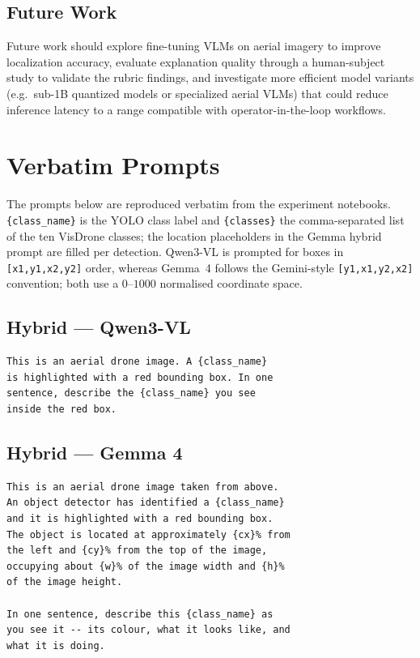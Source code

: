 \documentclass[acmtog, authorversion]{acmart}
\begin{document}
\subsection{Future Work}
Future work should explore fine-tuning VLMs on aerial imagery to
improve localization accuracy, evaluate explanation quality through
a human-subject study to validate the rubric findings, and investigate
more efficient model variants (e.g.\ sub-1B quantized models or
specialized aerial VLMs) that could reduce inference latency to
a range compatible with operator-in-the-loop workflows.




\appendix

\section{Verbatim Prompts}
\label{app:prompts}
The prompts below are reproduced verbatim from the experiment
notebooks. \texttt{\{class\_name\}} is the YOLO class label and
\texttt{\{classes\}} the comma-separated list of the ten VisDrone
classes; the location placeholders in the Gemma hybrid prompt are
filled per detection. Qwen3-VL is prompted for boxes in
\texttt{[x1,y1,x2,y2]} order, whereas Gemma~4 follows the Gemini-style
\texttt{[y1,x1,y2,x2]} convention; both use a $0$--$1000$ normalised
coordinate space.

\subsection{Hybrid --- Qwen3-VL}
\begin{verbatim}
This is an aerial drone image. A {class_name}
is highlighted with a red bounding box. In one
sentence, describe the {class_name} you see
inside the red box.
\end{verbatim}

\subsection{Hybrid --- Gemma 4}
\begin{verbatim}
This is an aerial drone image taken from above.
An object detector has identified a {class_name}
and it is highlighted with a red bounding box.
The object is located at approximately {cx}% from
the left and {cy}% from the top of the image,
occupying about {w}% of the image width and {h}%
of the image height.

In one sentence, describe this {class_name} as
you see it -- its colour, what it looks like, and
what it is doing.
\end{verbatim}
\end{document}
